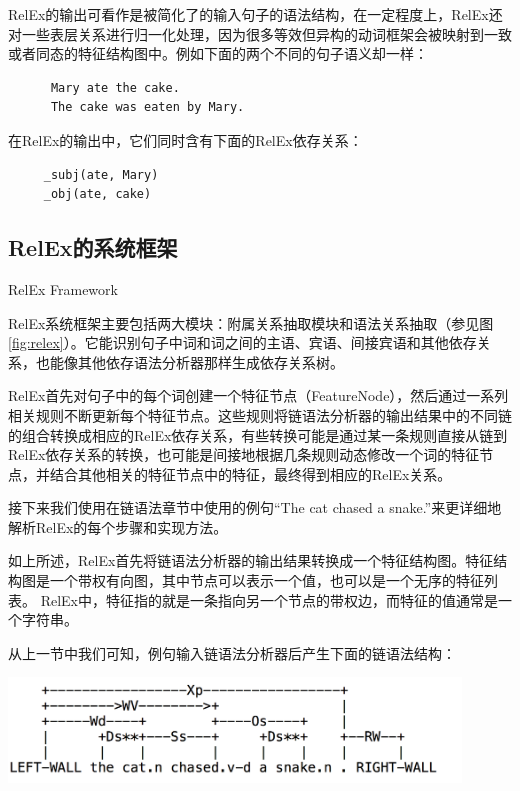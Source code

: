 RelEx的输出可看作是被简化了的输入句子的语法结构，在一定程度上，RelEx还对一些表层关系进行归一化处理，因为很多等效但异构的动词框架会被映射到一致或者同态的特征结构图中。例如下面的两个不同的句子语义却一样：

\begin{verbatim}
      Mary ate the cake.
      The cake was eaten by Mary. 
\end{verbatim}

在RelEx的输出中，它们同时含有下面的RelEx依存关系：

\begin{verbatim}
     _subj(ate, Mary)
     _obj(ate, cake)
\end{verbatim}

\subsection{RelEx的系统框架}{RelEx Framework}

RelEx系统框架主要包括两大模块：附属关系抽取模块和语法关系抽取（参见图\ref{fig:relex}）。它能识别句子中词和词之间的主语、宾语、间接宾语和其他依存关系，也能像其他依存语法分析器那样生成依存关系树。 

RelEx首先对句子中的每个词创建一个特征节点（FeatureNode），然后通过一系列相关规则不断更新每个特征节点。这些规则将链语法分析器的输出结果中的不同链的组合转换成相应的RelEx依存关系，有些转换可能是通过某一条规则直接从链到RelEx依存关系的转换，也可能是间接地根据几条规则动态修改一个词的特征节点，并结合其他相关的特征节点中的特征，最终得到相应的RelEx关系。

接下来我们使用在链语法章节中使用的例句“The cat chased a snake.”来更详细地解析RelEx的每个步骤和实现方法。


如上所述，RelEx首先将链语法分析器的输出结果转换成一个特征结构图。特征结构图是一个带权有向图，其中节点可以表示一个值，也可以是一个无序的特征列表。 RelEx中，特征指的就是一条指向另一个节点的带权边，而特征的值通常是一个字符串。

从上一节中我们可知，例句输入链语法分析器后产生下面的链语法结构： 

\includegraphics[width=12cm]{figures/catSnake.png}

